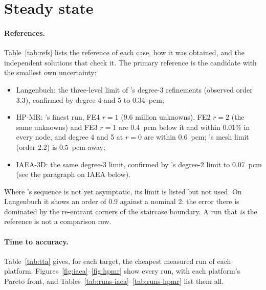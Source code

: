 \section{Steady state}
\label{sec:steady}

\paragraph{References.} Table~\ref{tab:refs} lists the reference of each case,
how it was obtained, and the independent solutions that check it. The
primary reference is the candidate with the smallest own uncertainty:
\begin{itemize}
\item Langenbuch: the three-level limit of \ffn's degree-3 refinements (observed
  order 3.3), confirmed by degree 4 and 5 to 0.34~pcm;
\item HP-MR: \ffn's finest run, FE4 $r=1$ (9.6 million unknowns). FE2 $r=2$
  (the same unknowns) and FE3 $r=1$ are 0.4~pcm below it and within 0.01\% in
  every node, and degree 4 and 5 at $r=0$ are within 0.6~pcm; \garnet's mesh
  limit (order 2.2) is 0.5~pcm away;
\item IAEA-3D: the same degree-3 limit, confirmed by \ffn's degree-2 limit
  to 0.07~pcm (see the paragraph on IAEA below).
\end{itemize}
Where \garnet's sequence is not yet asymptotic, its limit is listed but not
used. On Langenbuch it shows an order of 0.9 against a nominal 2: the error
there is dominated by the re-entrant corners of the staircase boundary. A
run that \emph{is} the reference is not a comparison row.

\begin{table}[h]
\caption{References and their checks. Uncertainty: the largest of the
extrapolation step, the spread of the independent high-degree solutions,
and (for an asymptotic series) half the cross-code difference.}
\label{tab:refs}
\end{table}

\paragraph{Time to accuracy.} Table~\ref{tab:tta} gives, for each target, the
cheapest measured run of each platform. Figures~\ref{fig:iaea}--\ref{fig:hpmr}
show every run, with each platform's Pareto front, and
Tables~\ref{tab:runs-iaea}--\ref{tab:runs-hpmr} list them all.

\begin{table}[h]
\caption{Time to accuracy (solve time, s): the cheapest run of each platform
that meets the target ($|\Delta k|$ and the largest node-power error; for the
transient, the largest power error over the run), and the ratio of \ffn's
better degree to \garnet. ``--'': no measured run meets the target.}
\label{tab:tta}
\end{table}

